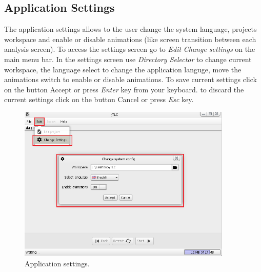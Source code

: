 \subsection*{Application Settings}
The application settings allows to the user change the system language, projects workspace and enable or disable animations (like screen transition between each analysis screen). To access the settings screen go to \emph{Edit}  \emph{Change settings} on the main menu bar.
In the settings screen use \emph{Directory Selector} to change current workspace, the language select to change the application languge, move the animations switch to enable or disable animations. To save current settings click on the button Accept or press \emph{Enter} key from your keyboard. to discard the current settings click on the button Cancel or press \emph{Esc} key.

\begin{figure}[H]
	\vspace{-1cm}
	\centering
	\includegraphics[width=385px]{imagenes/settings}
	\centering
	\vspace{-0.4cm}
	\caption{Application settings.}
	\label{fig:settings}
	\vspace{-0.25cm}
\end{figure}